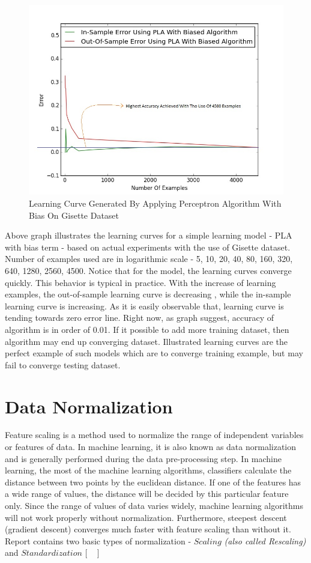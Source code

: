 \documentclass{article}
\begin{document}
\begin{figure}[H]
  \centering
    \includegraphics[width=6in]{images/LC.jpeg}
    \caption{Learning Curve Generated By Applying Perceptron Algorithm With Bias On Gisette Dataset}
    \label{2. Learning Curve}
  
\end{figure}
\par Above graph illustrates the learning curves for a simple learning model - PLA with bias term - based on actual experiments with the use of Gisette dataset. Number of examples used are in logarithmic scale - 5, 10, 20, 40, 80, 160, 320, 640, 1280, 2560, 4500. Notice that for the model, the learning curves converge quickly. This behavior is typical in practice. With the increase of learning examples, the out-of-sample learning curve is decreasing , while the in-sample learning curve is increasing. As it is easily observable that, learning curve is tending towards zero error line. Right now, as graph suggest, accuracy of algorithm is in order of 0.01. If it possible to add more training dataset, then algorithm may end up converging dataset. Illustrated learning curves are the perfect example of such models which are to converge training example, but may fail to converge testing dataset. 
\section{Data Normalization}
Feature scaling is a method used to normalize the range of independent variables or features of data. In machine learning, it is also known as data normalization and is generally performed during the data pre-processing step. In machine learning, the most of the machine learning algorithms, classifiers calculate the distance between two points by the euclidean distance. If one of the features has a wide range of values, the distance will be decided by this particular feature only.  Since the range of values of data varies widely, machine learning algorithms will not work properly without normalization. Furthermore, steepest descent (gradient descent) converges much faster with feature scaling than without it. Report contains two basic types of normalization - \(Scaling\) \textit{(also called Rescaling)} and \(Standardization\) [ ~\citep{Online2} ]
\end{document}
